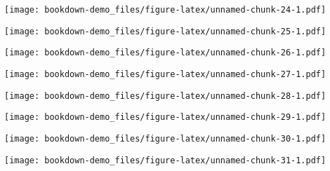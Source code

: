 \documentclass[]{book}
\begin{document}
\texttt{[image: bookdown-demo\_files/figure-latex/unnamed-chunk-24-1.pdf]}

\texttt{[image: bookdown-demo\_files/figure-latex/unnamed-chunk-25-1.pdf]}

\texttt{[image: bookdown-demo\_files/figure-latex/unnamed-chunk-26-1.pdf]}

\texttt{[image: bookdown-demo\_files/figure-latex/unnamed-chunk-27-1.pdf]}

\texttt{[image: bookdown-demo\_files/figure-latex/unnamed-chunk-28-1.pdf]}

\texttt{[image: bookdown-demo\_files/figure-latex/unnamed-chunk-29-1.pdf]}

\texttt{[image: bookdown-demo\_files/figure-latex/unnamed-chunk-30-1.pdf]}

\texttt{[image: bookdown-demo\_files/figure-latex/unnamed-chunk-31-1.pdf]}


\end{document}
